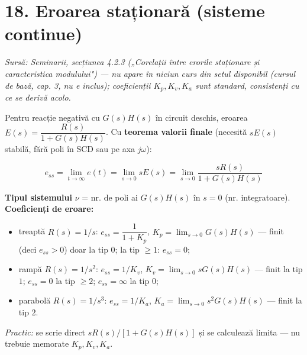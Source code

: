 \documentclass[10pt,a4paper]{article}
\newcommand{\srcnote}[1]{{\footnotesize\color{gray!55!black}\textit{Sursă: #1}}\par}
\newcommand{\tip}[1]{\textcolor{blue!55!black}{#1}}
\begin{document}
\section*{18. Eroarea staționară (sisteme continue)}\label{sec:18}
\srcnote{Seminarii, secțiunea 4.2.3 („Corelații între erorile staționare și caracteristica modulului") — nu apare în niciun curs din setul disponibil (cursul de bază, cap. 3, nu e inclus); coeficienții $K_p,K_v,K_a$ sunt standard, consistenți cu ce se derivă acolo.}
Pentru reacție negativă cu $G(s)H(s)$ în circuit deschis, eroarea $E(s)=\dfrac{R(s)}{1+G(s)H(s)}$. Cu \textbf{teorema valorii finale} (necesită $sE(s)$ stabilă, fără poli în SCD sau pe axa $j\omega$):
\begin{keyeq}\color{red!65!black}
$$e_{ss}=\lim_{t\to\infty}e(t)=\lim_{s\to0}sE(s)=\lim_{s\to0}\dfrac{sR(s)}{1+G(s)H(s)}$$
\end{keyeq}
\textbf{Tipul sistemului} $\nu$ = nr. de poli ai $G(s)H(s)$ în $s{=}0$ (nr. integratoare). \textbf{Coeficienți de eroare:}
\begin{itemize}
\item treaptă $R(s){=}1/s$: $e_{ss}=\dfrac{1}{1+K_p}$, $K_p=\lim_{s\to0}G(s)H(s)$ — finit (deci $e_{ss}{>}0$) doar la tip $0$; la tip $\ge1$: $e_{ss}=0$;
\item rampă $R(s){=}1/s^2$: $e_{ss}=1/K_v$, $K_v=\lim_{s\to0}sG(s)H(s)$ — finit la tip $1$; $e_{ss}{=}0$ la tip $\ge2$; $e_{ss}{=}\infty$ la tip $0$;
\item parabolă $R(s){=}1/s^3$: $e_{ss}=1/K_a$, $K_a=\lim_{s\to0}s^2G(s)H(s)$ — finit la tip $2$.
\end{itemize}
\tip{\textit{Practic:} se scrie direct $sR(s)/[1+G(s)H(s)]$ și se calculează limita — nu trebuie memorate $K_p,K_v,K_a$.}
\end{document}
